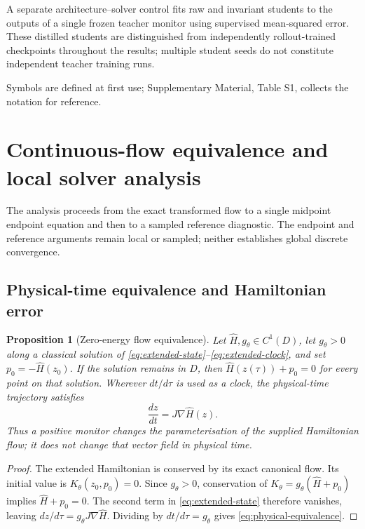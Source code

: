 \documentclass[final,3p,times]{elsarticle}
\newtheorem{proposition}{Proposition}
\begin{document}
A separate architecture--solver control fits raw and invariant students
to the outputs of a single frozen teacher monitor using supervised
mean-squared error. These distilled students are distinguished from
independently rollout-trained checkpoints throughout the results; multiple
student seeds do not constitute independent teacher training runs.

Symbols are defined at first use; Supplementary Material, Table S1,
collects the notation for reference.

\section{Continuous-flow equivalence and local solver analysis}
\label{sec:analysis}

The analysis proceeds from the exact transformed flow to a single
midpoint endpoint equation and then to a sampled reference diagnostic.
The endpoint and reference arguments remain local or sampled; neither
establishes global discrete convergence.

\subsection{Physical-time equivalence and Hamiltonian error}
\label{sec:continuous-equivalence}

\begin{proposition}[Zero-energy flow equivalence]
\label{prop:flow-equivalence}
Let $\widehat H,g_\theta\in C^1(D)$, let $g_\theta>0$ along a classical
solution of \eqref{eq:extended-state}--\eqref{eq:extended-clock}, and set
$p_0=-\widehat H(z_0)$. If the solution remains in $D$, then
$\widehat H(z(\tau))+p_0=0$ for every point on that solution. Wherever
$dt/d\tau$ is used as a clock, the physical-time trajectory satisfies
\begin{equation}
 \frac{dz}{dt}=J\nabla \widehat H(z).
 \label{eq:physical-equivalence}
\end{equation}
Thus a positive monitor changes the parameterisation of the supplied
Hamiltonian flow; it does not change that vector field in physical time.
\end{proposition}

\begin{proof}
The extended Hamiltonian is conserved by its exact canonical flow. Its
initial value is $K_\theta(z_0,p_0)=0$. Since $g_\theta>0$, conservation of
$K_\theta=g_\theta(\widehat H+p_0)$ implies
$\widehat H+p_0=0$. The second term in \eqref{eq:extended-state} therefore
vanishes, leaving $dz/d\tau=g_\theta J\nabla\widehat H$. Dividing by
$dt/d\tau=g_\theta$ gives \eqref{eq:physical-equivalence}.
\end{proof}
\end{document}
